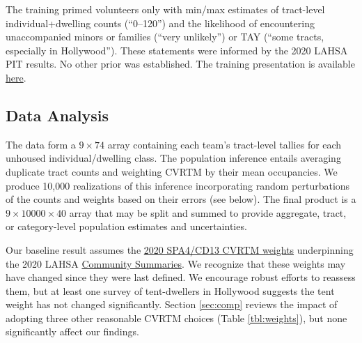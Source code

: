 \documentclass[11pt,twocolumn]{article}
\def\ntracts{40}
\begin{document}
The training primed volunteers only with min/max estimates of tract-level individual+dwelling 
counts (``0--120'') and the likelihood of encountering unaccompanied minors or families (``very unlikely'')
or TAY (``some tracts, especially in Hollywood''). These statements were informed by the 2020 
LAHSA PIT results. No other prior was established. The training presentation is available 
\href{https://drive.google.com/file/d/1xFrtU26yjPuiUv9KHZ3Uj2_sAoT1ClGo/view?usp=sharing}{here}.

\subsection{Data Analysis}
\label{sec:analysis}

The data form a $9\times74$ array containing each team's tract-level tallies for each unhoused 
individual/dwelling class. The population inference entails averaging duplicate tract counts and 
weighting CVRTM by their mean occupancies. We produce 10,000 realizations of this inference 
incorporating random perturbations of the counts and weights based on their 
errors (see below). The final product is a $9\times10000\times\ntracts$ array that may be split and 
summed to provide aggregate, tract, or category-level population estimates and uncertainties.

Our baseline result assumes the 
\href{https://www.lahsa.org/documents?id=4635-usc-2018-2020-multipliers-and-estimates-overview.pdf}
{2020 SPA4/CD13 CVRTM weights} underpinning the 2020 LAHSA 
\href{https://www.lahsa.org/documents?id=4686-2020-greater-los-angeles-city-community-homelessness-report-service-planning-area-4.pdf}{Community Summaries}. We recognize that these weights may have changed since they were last
defined. We encourage robust efforts to reassess them, but at least one survey of tent-dwellers in Hollywood 
suggests the tent weight has not changed significantly. Section \ref{sec:comp} reviews the impact of adopting three 
other reasonable CVRTM choices (Table \ref{tbl:weights}), but none significantly affect our findings.

\end{document}
